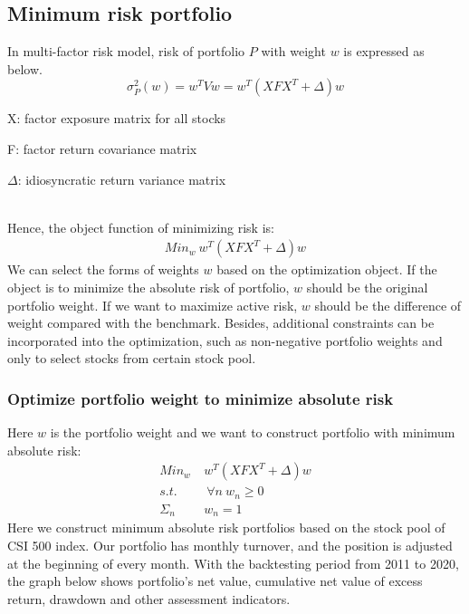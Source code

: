 \documentclass[10pt]{article}
\begin{document}
\subsection{Minimum risk portfolio}
In multi-factor risk model, risk of portfolio $P$ with weight $w$ is expressed as below.
~\\
\begin{equation}
    \sigma^2_P(w)=w^TVw=w^T(XFX^T+\Delta)w
\end{equation}
\centerline{X: factor exposure matrix for all stocks}
\centerline{F: factor return covariance matrix}
\centerline{$\Delta$: idiosyncratic return variance matrix}
~\\
Hence, the object function of minimizing risk is:
\begin{align}
    Min_w\ w^T(XFX^T+\Delta)w
\end{align}
We can select the forms of weights $w$ based on the optimization object. If the object is to minimize the absolute risk of portfolio, $w$ should be the original portfolio weight. If we want to maximize active risk, $w$ should be the difference of weight compared with the benchmark.
Besides, additional constraints can be incorporated into the optimization, such as non-negative portfolio weights and only to select stocks from certain stock pool.

\subsubsection{Optimize portfolio weight to minimize absolute risk}
Here $w$ is the portfolio weight and we want to construct portfolio with minimum absolute risk:
\begin{equation}
\begin{split}
    Min_w\ & w^T(XFX^T+\Delta)w\\
    s.t. &\ \forall n\ w_n\ge0\\
    \Sigma_n &w_n=1
\end{split}
\end{equation}
Here we construct minimum absolute risk portfolios based on the stock pool of CSI 500 index. Our portfolio has monthly turnover, and the position is adjusted at the beginning of every month. With the backtesting period from 2011 to 2020, the graph below shows portfolio's net value, cumulative net value of excess return, drawdown and other assessment indicators.
\end{document}
